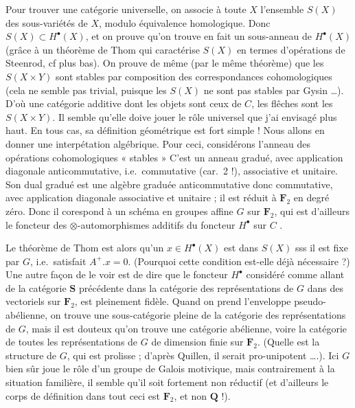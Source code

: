 \documentclass[11pt,a4paper]{article}
\begin{document}
Pour trouver une catégorie universelle, on associe à toute $X$
l'ensemble $S(X)$ des sous-variétés de $X$, modulo équivalence
homologique. Donc $S(X) \subset H^{\bullet}(X)$, et on prouve qu'on trouve en
fait un sous-anneau de $H^{\bullet}(X)$ (grâce à un théorème de Thom qui
caractérise $S(X)$ en termes d'opérations de Steenrod, cf plus bas). On prouve
de même (par le même théorème) que les $S(X \times Y)$ sont stables par
composition des correspondances cohomologiques (cela ne semble pas trivial,
puisque les $S(X)$ ne sont pas stables par Gysin …). D'où une catégorie additive
dont les objets sont ceux de $C$, les flêches sont les $S(X \times Y)$. Il
semble qu'elle doive jouer le rôle universel que j'ai envisagé plus haut. En
tous cas, sa définition géométrique est fort simple ! Nous allons en donner une
interpétation algébrique. Pour ceci, considérons l'anneau des opérations
cohomologiques « stables »  C'est un anneau gradué, avec application diagonale
anticommutative, i.e.\ commutative (car.\ 2 !), associative et unitaire. Son
dual gradué est une algèbre graduée anticommutative donc commutative, avec
application diagonale associative et unitaire ; il est réduit à
$\mathbf{F}_{2}$ en degré zéro. Donc il corespond à un schéma en groupes affine
$G$ sur $\mathbf{F}_{2}$, qui est d'ailleurs le foncteur des
$\otimes$-automorphismes additifs du foncteur $H^{\bullet}$ sur $C$ .
\struck{\ill{}}


Le théorème de Thom est alors qu'un $x \in H^{\bullet}(X)$ est dans $S(X)$ sss
il est fixe par $G$, i.e.\ satisfait $A^{+} . x = 0$. (Pourquoi cette condition
est-elle déjà nécessaire ?) Une autre façon de le voir est de dire que le
foncteur $H^{\bullet}$ considéré comme allant de la catégorie $\mathbf{S}$
précédente dans la catégorie des représentations de $G$ dans des vectoriels sur
$\mathbf{F}_{2}$, est pleinement fidèle. Quand on prend l'enveloppe
pseudo-abélienne, on trouve une sous-catégorie pleine de la catégorie des
représentations de $G$, mais il est douteux qu'on trouve une catégorie
abélienne, voire la catégorie de toutes les représentations de $G$ de dimension
finie sur $\mathbf{F}_{2}$. (Quelle est la structure de $G$, qui est prolisse ;
d'après Quillen, il serait pro-unipotent ….). Ici $G$ bien sûr joue le rôle
d'un groupe de Galois motivique, mais contrairement à la situation familière, il
semble qu'il soit fortement non réductif (et d'ailleurs le corps de définition
dans tout ceci est $\mathbf{F}_{2}$, et non $\mathbf{Q}$ !).
\end{document}
